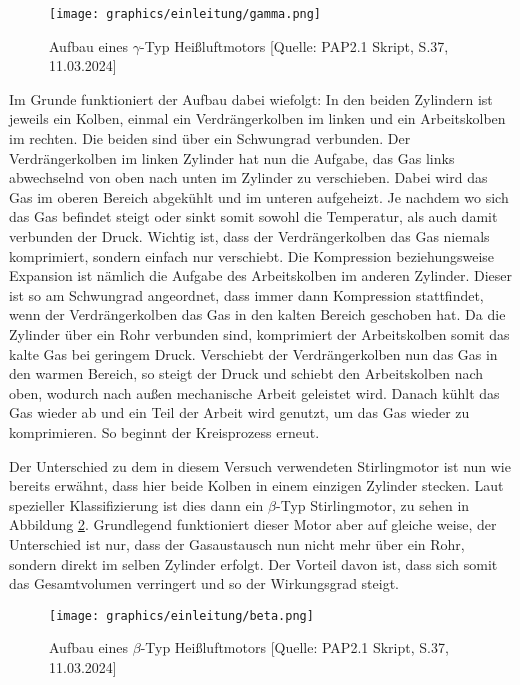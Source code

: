 \documentclass{article}
\begin{document}
\begin{figure}[!h]
    \centering
    \texttt{[image: graphics/einleitung/gamma.png]}
    \caption{Aufbau eines $\gamma$-Typ Heißluftmotors [Quelle: PAP2.1 Skript, S.37, 11.03.2024]}
    \label{fig:schema_gamma}
\end{figure}

Im Grunde funktioniert der Aufbau dabei wiefolgt: In den beiden Zylindern ist jeweils ein Kolben, einmal ein Verdrängerkolben im linken und ein Arbeitskolben im rechten. Die beiden sind über ein Schwungrad verbunden. Der Verdrängerkolben im linken Zylinder hat nun die Aufgabe, das Gas links abwechselnd von oben nach unten im Zylinder zu verschieben. Dabei wird das Gas im oberen Bereich abgekühlt und im unteren aufgeheizt. Je nachdem wo sich das Gas befindet steigt oder sinkt somit sowohl die Temperatur, als auch damit verbunden der Druck. Wichtig ist, dass der Verdrängerkolben das Gas niemals komprimiert, sondern einfach nur verschiebt. Die Kompression beziehungsweise Expansion ist nämlich die Aufgabe des Arbeitskolben im anderen Zylinder. Dieser ist so am Schwungrad angeordnet, dass immer dann Kompression stattfindet, wenn der Verdrängerkolben das Gas in den kalten Bereich geschoben hat. Da die Zylinder über ein Rohr verbunden sind, komprimiert der Arbeitskolben somit das kalte Gas bei geringem Druck. Verschiebt der Verdrängerkolben nun das Gas in den warmen Bereich, so steigt der Druck und schiebt den Arbeitskolben nach oben, wodurch nach außen mechanische Arbeit geleistet wird. Danach kühlt das Gas wieder ab und ein Teil der Arbeit wird genutzt, um das Gas wieder zu komprimieren. So beginnt der Kreisprozess erneut.   

Der Unterschied zu dem in diesem Versuch verwendeten Stirlingmotor ist nun wie bereits erwähnt, dass hier beide Kolben in einem einzigen Zylinder stecken. Laut spezieller Klassifizierung ist dies dann ein $\beta$-Typ Stirlingmotor, zu sehen in Abbildung \ref{fig:schema_beta}. Grundlegend funktioniert dieser Motor aber auf gleiche weise, der Unterschied ist nur, dass der Gasaustausch nun nicht mehr über ein Rohr, sondern direkt im selben Zylinder erfolgt. Der Vorteil davon ist, dass sich somit das Gesamtvolumen verringert und so der Wirkungsgrad steigt. 

\begin{figure}[!h]
    \centering
    \texttt{[image: graphics/einleitung/beta.png]}
    \caption{Aufbau eines $\beta$-Typ Heißluftmotors [Quelle: PAP2.1 Skript, S.37, 11.03.2024]}
    \label{fig:schema_beta}
\end{figure}
\end{document}
